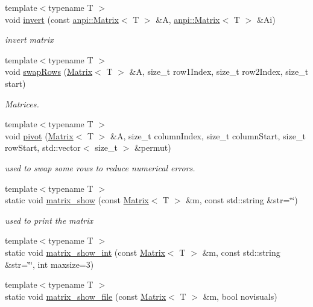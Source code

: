 \begin{DoxyCompactItemize}
{\footnotesize template$<$typename T $>$ }\\void \hyperlink{namespaceanpi_a7b13e1af574b2eb816cb8f65cc2e6c56}{invert} (const \hyperlink{classanpi_1_1Matrix}{anpi\+::\+Matrix}$<$ T $>$ \&A, \hyperlink{classanpi_1_1Matrix}{anpi\+::\+Matrix}$<$ T $>$ \&Ai)
\begin{DoxyCompactList}\small\item\em invert matrix \end{DoxyCompactList}\item 
{\footnotesize template$<$typename T $>$ }\\void \hyperlink{namespaceanpi_a7b518e385d9e5b7eb141d31fce717247}{swap\+Rows} (\hyperlink{classanpi_1_1Matrix}{Matrix}$<$ T $>$ \&A, size\+\_\+t row1\+Index, size\+\_\+t row2\+Index, size\+\_\+t start)
\begin{DoxyCompactList}\small\item\em Matrices. \end{DoxyCompactList}\item 
{\footnotesize template$<$typename T $>$ }\\void \hyperlink{namespaceanpi_a28b5b58719a454e2a5e8343a9c035d06}{pivot} (\hyperlink{classanpi_1_1Matrix}{Matrix}$<$ T $>$ \&A, size\+\_\+t column\+Index, size\+\_\+t column\+Start, size\+\_\+t row\+Start, std\+::vector$<$ size\+\_\+t $>$ \&permut)
\begin{DoxyCompactList}\small\item\em used to swap some rows to reduce numerical errors. \end{DoxyCompactList}\item 
{\footnotesize template$<$typename T $>$ }\\static void \hyperlink{namespaceanpi_afa95d4a99d0176f086ca7babb01c4e55}{matrix\+\_\+show} (const \hyperlink{classanpi_1_1Matrix}{Matrix}$<$ T $>$ \&m, const std\+::string \&str=\char`\"{}\char`\"{})
\begin{DoxyCompactList}\small\item\em used to print the matrix \end{DoxyCompactList}\item 
{\footnotesize template$<$typename T $>$ }\\static void \hyperlink{namespaceanpi_a0864d768e170ecba07b469f4795ecf59}{matrix\+\_\+show\+\_\+int} (const \hyperlink{classanpi_1_1Matrix}{Matrix}$<$ T $>$ \&m, const std\+::string \&str=\char`\"{}\char`\"{}, int maxsize=3)
\item 
{\footnotesize template$<$typename T $>$ }\\static void \hyperlink{namespaceanpi_a18764748dc82a28d7d9d890332fb703a}{matrix\+\_\+show\+\_\+file} (const \hyperlink{classanpi_1_1Matrix}{Matrix}$<$ T $>$ \&m, bool novisuals)

\end{DoxyCompactItemize}
